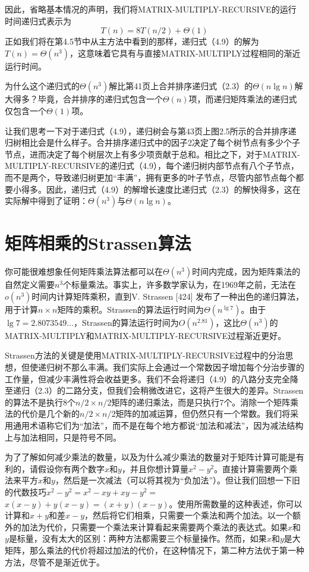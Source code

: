 \documentclass[lang=cn,newtx,10pt,scheme=chinese]{elegantbook}
\begin{document}
因此，省略基本情况的声明，我们将MATRIX-MULTIPLY-RECURSIVE的运行时间递归式表示为
$$
T(n)=8 T(n / 2)+\Theta(1)
$$
正如我们将在第4.5节中从主方法中看到的那样，递归式（4.9）的解为$T(n)=\Theta\left(n^3\right)$，这意味着它具有与直接MATRIX-MULTIPLY过程相同的渐近运行时间。

为什么这个递归式的$\Theta\left(n^3\right)$解比第41页上合并排序递归式（2.3）的$\Theta(n \lg n)$解大得多？毕竟，合并排序的递归式包含一个$\Theta(n)$项，而递归矩阵乘法的递归式仅包含一个$\Theta(1)$项。

让我们思考一下对于递归式（4.9），递归树会与第43页上图2.5所示的合并排序递归树相比会是什么样子。合并排序递归式中的因子2决定了每个树节点有多少个子节点，进而决定了每个树层次上有多少项贡献于总和。相比之下，对于MATRIX-MULTIPLY-RECURSIVE的递归式（4.9），每个递归树内部节点有八个子节点，而不是两个，导致递归树更加“丰满”，拥有更多的叶子节点，尽管内部节点每个都要小得多。因此，递归式（4.9）的解增长速度比递归式（2.3）的解快得多，这在实际解中得到了证明：$\Theta\left(n^3\right)$与$\Theta(n \lg n)$。

\section{矩阵相乘的Strassen算法}

你可能很难想象任何矩阵乘法算法都可以在$\Theta\left(n^3\right)$时间内完成，因为矩阵乘法的自然定义需要$n^3$个标量乘法。事实上，许多数学家认为，在1969年之前，无法在$o\left(n^3\right)$时间内计算矩阵乘积，直到V. Strassen [424] 发布了一种出色的递归算法，用于计算$n \times n$矩阵的乘积。Strassen的算法运行时间为$\Theta\left(n^{\lg 7}\right)$。由于$\lg 7=2.8073549 \ldots$，Strassen的算法运行时间为$O\left(n^{2.81}\right)$，这比$\Theta\left(n^3\right)$的MATRIX-MULTIPLY和MATRIX-MULTIPLY-RECURSIVE过程渐近更好。

Strassen方法的关键是使用MATRIX-MULTIPLY-RECURSIVE过程中的分治思想，但使递归树不那么丰满。我们实际上会通过一个常数因子增加每个分治步骤的工作量，但减少丰满性将会收益更多。我们不会将递归（4.9）的八路分支完全降至递归（2.3）的二路分支，但我们会稍微改进它，这将产生很大的差异。Strassen的算法不是执行$8$个$n / 2 \times n / 2$矩阵的递归乘法，而是只执行$7$个。消除一个矩阵乘法的代价是几个新的$n / 2 \times n / 2$矩阵的加减运算，但仍然只有一个常数。我们将采用通用术语称它们为“加法”，而不是在每个地方都说“加法和减法”，因为减法结构上与加法相同，只是符号不同。

为了了解如何减少乘法的数量，以及为什么减少乘法的数量对于矩阵计算可能是有利的，请假设你有两个数字$x$和$y$，并且你想计算量$x^2-y^2$。直接计算需要两个乘法来平方$x$和$y$，然后是一次减法（可以将其视为“负加法”）。但让我们回想一下旧的代数技巧$x^2-y^2=x^2-x y+x y-y^2=$ $x(x-y)+y(x-y)=(x+y)(x-y)$。使用所需数量的这种表述，你可以计算和$x+y$和差$x-y$，然后将它们相乘，只需要一个乘法和两个加法。以一个额外的加法为代价，只需要一个乘法来计算看起来需要两个乘法的表达式。如果$x$和$y$是标量，没有太大的区别：两种方法都需要三个标量操作。然而，如果$x$和$y$是大矩阵，那么乘法的代价将超过加法的代价，在这种情况下，第二种方法优于第一种方法，尽管不是渐近优于。
\end{document}
